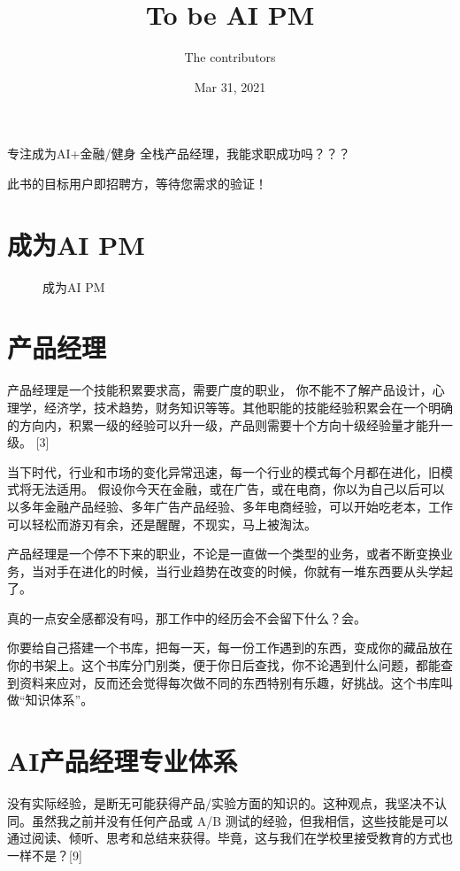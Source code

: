 \documentclass[letterpaper,11pt,english]{sphinxmanual}
\title{To be AI PM}
\date{Mar 31, 2021}
\author{The contributors}
\begin{document}
\pagestyle{empty}
\sphinxmaketitle
\pagestyle{plain}
\sphinxtableofcontents
\pagestyle{normal}
\label{\detokenize{index::doc}}


专注成为AI+金融/健身 全栈产品经理，我能求职成功吗？？？

此书的目标用户即招聘方，等待您需求的验证！


\chapter{成为AI PM}
\label{\detokenize{index:ai-pm}}
\begin{figure}[H]
\centering
\capstart

\noindent{}
\caption{成为AI PM}\label{\detokenize{index:id8}}\end{figure}


\chapter{产品经理}
\label{\detokenize{index:id1}}
产品经理是一个技能积累要求高，需要广度的职业，
你不能不了解产品设计，心理学，经济学，技术趋势，财务知识等等。其他职能的技能经验积累会在一个明确的方向内，积累一级的经验可以升一级，产品则需要十个方向十级经验量才能升一级。
{[}3{]}

当下时代，行业和市场的变化异常迅速，每一个行业的模式每个月都在进化，旧模式将无法适用。
假设你今天在金融，或在广告，或在电商，你以为自己以后可以以多年金融产品经验、多年广告产品经验、多年电商经验，可以开始吃老本，工作可以轻松而游刃有余，还是醒醒，不现实，马上被淘汰。

产品经理是一个停不下来的职业，不论是一直做一个类型的业务，或者不断变换业务，当对手在进化的时候，当行业趋势在改变的时候，你就有一堆东西要从头学起了。

真的一点安全感都没有吗，那工作中的经历会不会留下什么？会。

你要给自己搭建一个书库，把每一天，每一份工作遇到的东西，变成你的藏品放在你的书架上。这个书库分门别类，便于你日后查找，你不论遇到什么问题，都能查到资料来应对，反而还会觉得每次做不同的东西特别有乐趣，好挑战。这个书库叫做“知识体系”。



\chapter{AI产品经理专业体系}
\label{\detokenize{index:ai}}
没有实际经验，是断无可能获得产品/实验方面的知识的。这种观点，我坚决不认同。虽然我之前并没有任何产品或
A/B
测试的经验，但我相信，这些技能是可以通过阅读、倾听、思考和总结来获得。毕竟，这与我们在学校里接受教育的方式也一样不是？{[}9{]}
\end{document}
